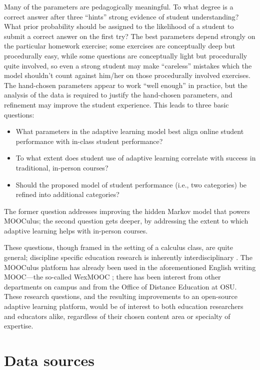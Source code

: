 \documentclass[12pt]{article}
\begin{document}
Many of the parameters are pedagogically meaningful.  To what degree
is a correct answer after three ``hints'' strong evidence of student
understanding?  What prior probability should be assigned to the
likelihood of a student to submit a correct answer on the first try?
The best parameters depend strongly on the particular homework exercise;
some exercises are conceptually deep but procedurally easy, while some
questions are conceptually light but procedurally quite involved, so
even a strong student may make ``careless'' mistakes which the model
shouldn't count against him/her on those procedurally involved
exercises.  The hand-chosen parameters appear to work ``well enough''
in practice, but the analysis of the data is required to justify the
hand-chosen parameters, and refinement may improve the student
experience. This leads to three basic questions:
\begin{itemize}
\item What parameters in the adaptive learning model best align online
  student performance with in-class student performance?
\item To what extent does student use of adaptive learning correlate
  with success in traditional, in-person courses?
\item Should the proposed model of student performance (i.e., two
  categories) be refined into additional categories?
\end{itemize}
The former question addresses improving the hidden Markov model that
powers MOOCulus; the second question gets deeper, by addressing the
extent to which adaptive learning helps with in-person courses.

These questions, though framed in the setting of a calculus class, are
quite general; discipline specific education research is
inherently interdisciplinary \cite{dber-report}.  The MOOCulus
platform has already been used in the aforementioned English writing
MOOC---the so-called WexMOOC \parencite{gates-foundation-grant}; there
has been interest from other departments on campus and from the Office
of Distance Education at OSU.  These research questions, and the
resulting improvements to an open-source adaptive learning platform,
would be of interest to both education researchers and educators
alike, regardless of their chosen content area or specialty of
expertise.

\section{Data sources}
\end{document}

